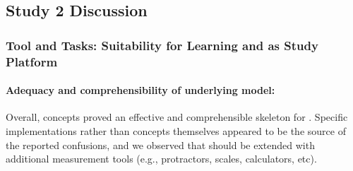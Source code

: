 


%
\subsection{Study 2 Discussion} 
%
%

    

\subsubsection{Tool and Tasks: Suitability for Learning and as Study Platform}
\paragraph{Adequacy and comprehensibility of underlying model:} Overall,  \HandsOn  concepts proved an effective and comprehensible skeleton for \SpringSim. 
Specific implementations rather than concepts themselves 
 appeared to be the source of the reported confusions, and 
 we observed that \HandsOn should be extended %
 with additional measurement tools (e.g., protractors, scales, calculators, etc). 


